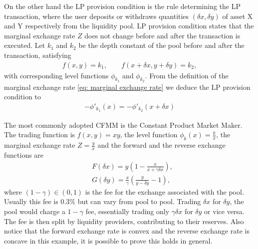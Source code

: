 On the other hand the LP provision condition is the rule determining the LP
transaction, where the user deposits or withdraws quantities $(\delta x,
\delta y)$ of asset X and Y respectively from the liquidity pool. LP
provision condition states that the marginal exchange rate $Z$ does not
change before and after the transaction is executed. Let $k_1$ and $k_2$ be
the depth constant of the pool before and after the transaction, satisfying
\begin{align}
    f(x, y) = k_1, \qquad f(x+\delta x, y+\delta y) = k_2,
\end{align}
with corresponding level functions $\phi_{k_1}$ and $\phi_{k_2}$. From the
definition of the marginal exchange rate \ref{eq: marginal exchange rate} we
deduce the LP provision condition to
\begin{align}
    -\phi'_{k_1}(x) = -\phi'_{k_2}(x + \delta x)
\end{align}
\newline

The most commonly adopted CFMM is the Constant Product Market Maker. The
trading function is $f(x, y) = xy$, the level function $\phi_k(x) =
\frac{k}{x}$, the marginal exchange rate $Z = \frac{y}{x}$ and the forward
and the reverse exchange functions are
\begin{align}
    &F(\delta x) = y\left(1-\frac{x}{x+\gamma \delta x}\right),\\
    &G(\delta y) = \frac{x}{\gamma}\left(\frac{y}{y-\delta y} - 1\right),
\end{align}
where $(1-\gamma) \in (0,1)$ is the fee for the exchange associated with the
pool. Usually this fee is $0.3\%$ but can vary from pool to pool. Trading
$\delta x$ for $\delta y$, the pool would charge a $1-\gamma$ fee, essentially
trading only $\gamma \delta x$ for $\delta y$ or vice versa. The fee is then
split by liquidity providers, contributing to their reserves. Also notice
that the forward exchange rate is convex and the reverse exchange rate is
concave in this example, it is possible to prove this holds in general.
